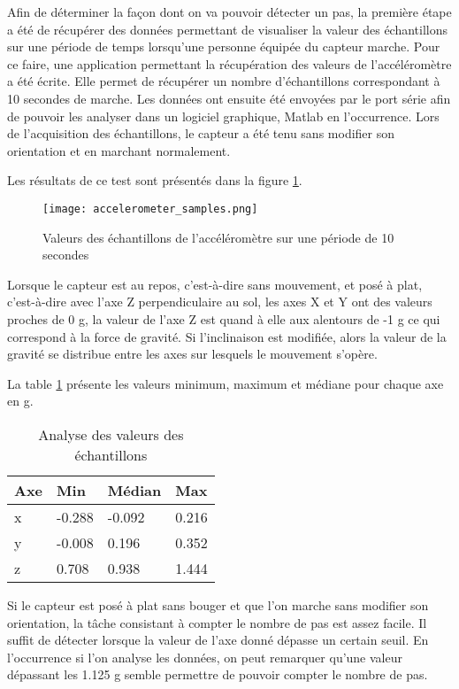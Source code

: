 Afin de déterminer la façon dont on va pouvoir détecter un pas, la première étape a été de récupérer des données permettant de visualiser la valeur des échantillons sur une période de temps lorsqu'une personne équipée du capteur marche. Pour ce faire, une application permettant la récupération des valeurs de l'accéléromètre a été écrite. Elle permet de récupérer un nombre d'échantillons correspondant à 10 secondes de marche. Les données ont ensuite été envoyées par le port série afin de pouvoir les analyser dans un logiciel graphique, Matlab en l'occurrence. Lors de l'acquisition des échantillons, le capteur a été tenu sans modifier son orientation et en marchant normalement.

Les résultats de ce test sont présentés dans la figure \ref{fig:graph_accel}.

\begin{figure}[htb]
\centering 
\texttt{[image: accelerometer\_samples.png]} 
\caption{Valeurs des échantillons de l'accéléromètre sur une période de 10 secondes}
\label{fig:graph_accel}
\end{figure}

Lorsque le capteur est au repos, c'est-à-dire sans mouvement, et posé à plat, c'est-à-dire avec l'axe Z perpendiculaire au sol, les axes X et Y ont des valeurs proches de 0 g, la valeur de l'axe Z est quand à elle aux alentours de -1 g ce qui correspond à la force de gravité. Si l'inclinaison est modifiée, alors la valeur de la gravité se distribue entre les axes sur lesquels le mouvement s'opère.

La table \ref{tab:analysis_samples} présente les valeurs minimum, maximum et médiane pour chaque axe en g.

\begin{table}[htb]
\caption{Analyse des valeurs des échantillons}
\label{tab:analysis_samples}
\centering
\begin{tabular}{ l l l l }
\toprule
Axe & Min & Médian & Max \\
\midrule
x & -0.288 & -0.092 & 0.216 \\
y & -0.008 & 0.196 & 0.352 \\
z & 0.708 & 0.938 & 1.444 \\
\bottomrule 
\end{tabular}
\end{table}

Si le capteur est posé à plat sans bouger et que l'on marche sans modifier son orientation, la tâche consistant à compter le nombre de pas est assez facile. Il suffit de détecter lorsque la valeur de l'axe donné dépasse un certain seuil. En l'occurrence si l'on analyse les données, on peut remarquer qu'une valeur dépassant les 1.125 g semble permettre de pouvoir compter le nombre de pas.

